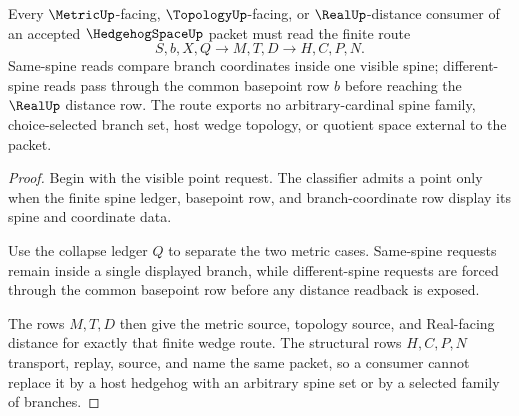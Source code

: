 \begin{theorem}
\label{thm:hedgehog-space-metric-wedge-route}
Every $\MetricUp$-facing, $\TopologyUp$-facing, or $\RealUp$-distance consumer
of an accepted $\HedgehogSpaceUp$ packet must read the finite route
$$
S,b,X,Q \to M,T,D \to H,C,P,N .
$$
Same-spine reads compare branch coordinates inside one visible spine;
different-spine reads pass through the common basepoint row $b$ before
reaching the $\RealUp$ distance row. The route exports no arbitrary-cardinal
spine family, choice-selected branch set, host wedge topology, or quotient
space external to the packet.
\end{theorem}
\begin{proof}
Begin with the visible point request. The classifier admits a point only when
the finite spine ledger, basepoint row, and branch-coordinate row display its
spine and coordinate data.

Use the collapse ledger $Q$ to separate the two metric cases. Same-spine
requests remain inside a single displayed branch, while different-spine
requests are forced through the common basepoint row before any distance
readback is exposed.

The rows $M,T,D$ then give the metric source, topology source, and Real-facing
distance for exactly that finite wedge route. The structural rows $H,C,P,N$
transport, replay, source, and name the same packet, so a consumer cannot
replace it by a host hedgehog with an arbitrary spine set or by a selected
family of branches.
\end{proof}




